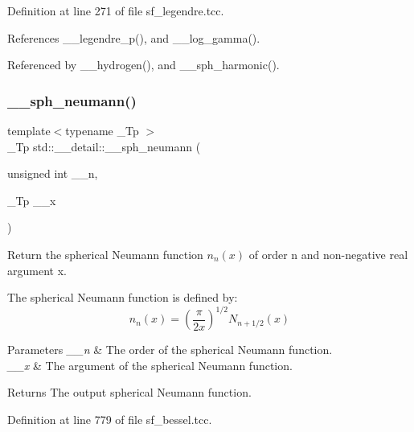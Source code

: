 Definition at line 271 of file sf\+\_\+legendre.\+tcc.



References \+\_\+\+\_\+legendre\+\_\+p(), and \+\_\+\+\_\+log\+\_\+gamma().



Referenced by \+\_\+\+\_\+hydrogen(), and \+\_\+\+\_\+sph\+\_\+harmonic().

\mbox{\label{namespacestd_1_1____detail_a94ac68003333b86b157a3b1e6ce44830}} 
\subsubsection{\texorpdfstring{\+\_\+\+\_\+sph\+\_\+neumann()}{\_\_sph\_neumann()}\hspace{0.1cm}{\footnotesize\ttfamily [1/2]}}
{\footnotesize\ttfamily template$<$typename \+\_\+\+Tp $>$ \\
\+\_\+\+Tp std\+::\+\_\+\+\_\+detail\+::\+\_\+\+\_\+sph\+\_\+neumann (\begin{DoxyParamCaption}\item[{unsigned int}]{\+\_\+\+\_\+n,  }\item[{\+\_\+\+Tp}]{\+\_\+\+\_\+x }\end{DoxyParamCaption})}



Return the spherical Neumann function $ n_n(x) $ of order n and non-\/negative real argument {\ttfamily x}. 

The spherical Neumann function is defined by\+: \[ n_n(x) = \left(\frac{\pi}{2x} \right) ^{1/2} N_{n+1/2}(x) \]


\begin{DoxyParams}{Parameters}
{\em \+\_\+\+\_\+n} & The order of the spherical Neumann function. \\
\hline
{\em \+\_\+\+\_\+x} & The argument of the spherical Neumann function. \\
\hline
\end{DoxyParams}
\begin{DoxyReturn}{Returns}
The output spherical Neumann function. 
\end{DoxyReturn}


Definition at line 779 of file sf\+\_\+bessel.\+tcc.




